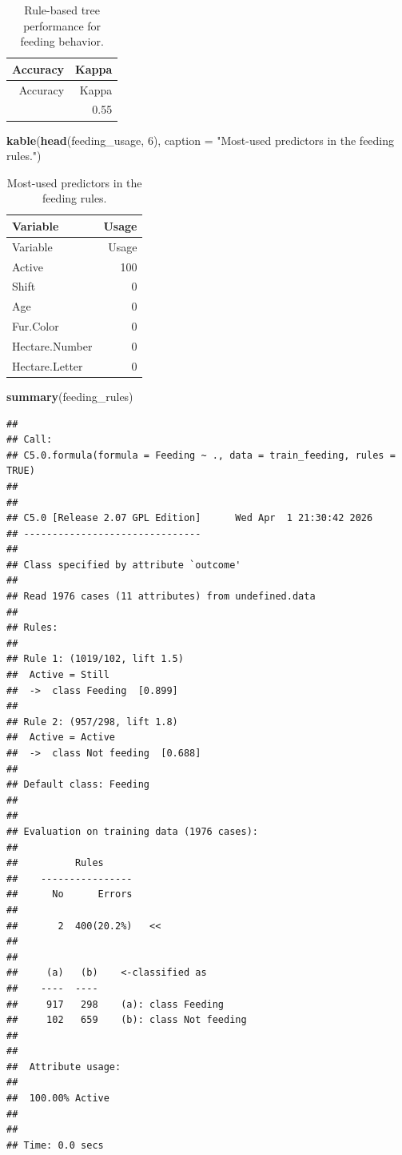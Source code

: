 \documentclass[
  11pt,
]{article}
\newenvironment{Shaded}{\begin{snugshade}}{\end{snugshade}}
\newcommand{\AttributeTok}[1]{\textcolor[rgb]{0.13,0.29,0.53}{#1}}
\newcommand{\DecValTok}[1]{\textcolor[rgb]{0.00,0.00,0.81}{#1}}
\newcommand{\FunctionTok}[1]{\textcolor[rgb]{0.13,0.29,0.53}{\textbf{#1}}}
\newcommand{\NormalTok}[1]{#1}
\newcommand{\StringTok}[1]{\textcolor[rgb]{0.31,0.60,0.02}{#1}}
\begin{document}
\begin{longtable}[]{@{}rr@{}}
\caption{Rule-based tree performance for feeding
behavior.}\tabularnewline
\toprule\noalign{}
Accuracy & Kappa \\
\midrule\noalign{}
\endfirsthead
\toprule\noalign{}
Accuracy & Kappa \\
\midrule\noalign{}
\endhead
\bottomrule\noalign{}
\endlastfoot
0.778 & 0.55 \\
\end{longtable}

\begin{Shaded}
\begin{Highlighting}[]
\FunctionTok{kable}\NormalTok{(}\FunctionTok{head}\NormalTok{(feeding\_usage, }\DecValTok{6}\NormalTok{), }\AttributeTok{caption =} \StringTok{"Most{-}used predictors in the feeding rules."}\NormalTok{)}
\end{Highlighting}
\end{Shaded}

\begin{longtable}[]{@{}lr@{}}
\caption{Most-used predictors in the feeding rules.}\tabularnewline
\toprule\noalign{}
Variable & Usage \\
\midrule\noalign{}
\endfirsthead
\toprule\noalign{}
Variable & Usage \\
\midrule\noalign{}
\endhead
\bottomrule\noalign{}
\endlastfoot
Active & 100 \\
Shift & 0 \\
Age & 0 \\
Fur.Color & 0 \\
Hectare.Number & 0 \\
Hectare.Letter & 0 \\
\end{longtable}

\begin{Shaded}
\begin{Highlighting}[]
\FunctionTok{summary}\NormalTok{(feeding\_rules)}
\end{Highlighting}
\end{Shaded}

\begin{verbatim}
## 
## Call:
## C5.0.formula(formula = Feeding ~ ., data = train_feeding, rules = TRUE)
## 
## 
## C5.0 [Release 2.07 GPL Edition]      Wed Apr  1 21:30:42 2026
## -------------------------------
## 
## Class specified by attribute `outcome'
## 
## Read 1976 cases (11 attributes) from undefined.data
## 
## Rules:
## 
## Rule 1: (1019/102, lift 1.5)
##  Active = Still
##  ->  class Feeding  [0.899]
## 
## Rule 2: (957/298, lift 1.8)
##  Active = Active
##  ->  class Not feeding  [0.688]
## 
## Default class: Feeding
## 
## 
## Evaluation on training data (1976 cases):
## 
##          Rules     
##    ----------------
##      No      Errors
## 
##       2  400(20.2%)   <<
## 
## 
##     (a)   (b)    <-classified as
##    ----  ----
##     917   298    (a): class Feeding
##     102   659    (b): class Not feeding
## 
## 
##  Attribute usage:
## 
##  100.00% Active
## 
## 
## Time: 0.0 secs
\end{verbatim}
\end{document}
